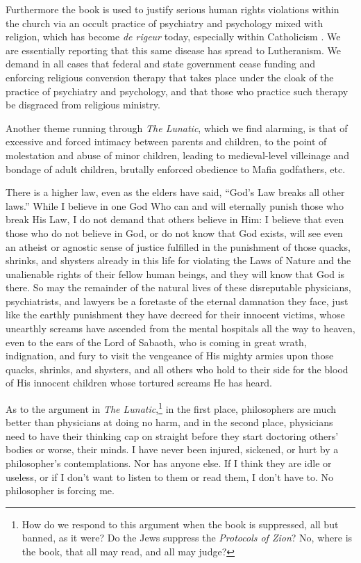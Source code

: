 \documentclass[letterpaper]{article}
\begin{document}
Furthermore the book is used to justify serious human rights violations within the church via an occult practice of psychiatry and psychology mixed with religion, which has become \textit{de rigeur} today, especially within Catholicism \cite[etc.]{catholicpsych,kugelmann2011}.  We are essentially reporting that this same disease has spread to Lutheranism.  We demand in all cases that federal and state government cease funding and enforcing religious conversion therapy that takes place under the cloak of the practice of psychiatry and psychology, and that those who practice such therapy be disgraced from religious ministry.

Another theme running through \textit{The Lunatic}, which we find alarming, is that of excessive and forced intimacy between parents and children, to the point of molestation and abuse of minor children, leading to medieval-level villeinage and bondage of adult children, brutally enforced obedience to Mafia godfathers, etc.

There is a higher law, even as the elders have said, ``God's Law breaks all other laws.'' While I believe in one God Who can and will eternally punish those who break His Law, I do not demand that others believe in Him: I believe that even those who do not believe in God, or do not know that God exists, will see even an atheist or agnostic sense of justice fulfilled in the punishment of those quacks, shrinks, and shysters already in this life for violating the Laws of Nature and the unalienable rights of their fellow human beings, and they will know that God is there.  So may the remainder of the natural lives of these disreputable physicians, psychiatrists, and lawyers be a foretaste of the eternal damnation they face, just like the earthly punishment they have decreed for their innocent victims, whose unearthly screams have ascended from the mental hospitals all the way to heaven, even to the ears of the Lord of Sabaoth, who is coming in great wrath, indignation, and fury to visit the vengeance of His mighty armies upon those quacks, shrinks, and shysters, and all others who hold to their side for the blood of His innocent children whose tortured screams He has heard.

As to the argument in \textit{The Lunatic},\footnote{How do we respond to this argument when the book is suppressed, all but banned, as it were?  Do the Jews suppress the \textit{Protocols of Zion}?  No, where is the book, that all may read, and all may judge?} in the first place, philosophers are much better than physicians at doing no harm, and in the second place, physicians need to have their thinking cap on straight before they start doctoring others' bodies or worse, their minds.  I have never been injured, sickened, or hurt by a philosopher's contemplations.  Nor has anyone else.  If I think they are idle or useless, or if I don't want to listen to them or read them, I don't have to.  No philosopher is forcing me.  
\end{document}
